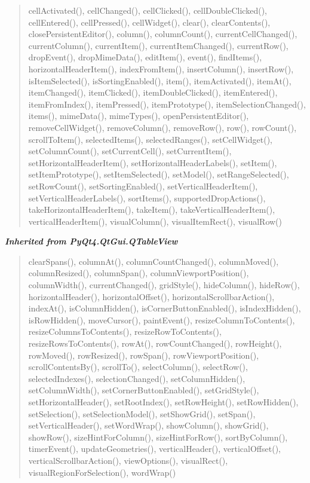 \begin{quote}
cellActivated(), cellChanged(), cellClicked(), cellDoubleClicked(), cellEntered(), cellPressed(), cellWidget(), clear(), clearContents(), closePersistentEditor(), column(), columnCount(), currentCellChanged(), currentColumn(), currentItem(), currentItemChanged(), currentRow(), dropEvent(), dropMimeData(), editItem(), event(), findItems(), horizontalHeaderItem(), indexFromItem(), insertColumn(), insertRow(), isItemSelected(), isSortingEnabled(), item(), itemActivated(), itemAt(), itemChanged(), itemClicked(), itemDoubleClicked(), itemEntered(), itemFromIndex(), itemPressed(), itemPrototype(), itemSelectionChanged(), items(), mimeData(), mimeTypes(), openPersistentEditor(), removeCellWidget(), removeColumn(), removeRow(), row(), rowCount(), scrollToItem(), selectedItems(), selectedRanges(), setCellWidget(), setColumnCount(), setCurrentCell(), setCurrentItem(), setHorizontalHeaderItem(), setHorizontalHeaderLabels(), setItem(), setItemPrototype(), setItemSelected(), setModel(), setRangeSelected(), setRowCount(), setSortingEnabled(), setVerticalHeaderItem(), setVerticalHeaderLabels(), sortItems(), supportedDropActions(), takeHorizontalHeaderItem(), takeItem(), takeVerticalHeaderItem(), verticalHeaderItem(), visualColumn(), visualItemRect(), visualRow()
\end{quote}

\large{\textbf{\textit{Inherited from PyQt4.QtGui.QTableView}}}

\begin{quote}
clearSpans(), columnAt(), columnCountChanged(), columnMoved(), columnResized(), columnSpan(), columnViewportPosition(), columnWidth(), currentChanged(), gridStyle(), hideColumn(), hideRow(), horizontalHeader(), horizontalOffset(), horizontalScrollbarAction(), indexAt(), isColumnHidden(), isCornerButtonEnabled(), isIndexHidden(), isRowHidden(), moveCursor(), paintEvent(), resizeColumnToContents(), resizeColumnsToContents(), resizeRowToContents(), resizeRowsToContents(), rowAt(), rowCountChanged(), rowHeight(), rowMoved(), rowResized(), rowSpan(), rowViewportPosition(), scrollContentsBy(), scrollTo(), selectColumn(), selectRow(), selectedIndexes(), selectionChanged(), setColumnHidden(), setColumnWidth(), setCornerButtonEnabled(), setGridStyle(), setHorizontalHeader(), setRootIndex(), setRowHeight(), setRowHidden(), setSelection(), setSelectionModel(), setShowGrid(), setSpan(), setVerticalHeader(), setWordWrap(), showColumn(), showGrid(), showRow(), sizeHintForColumn(), sizeHintForRow(), sortByColumn(), timerEvent(), updateGeometries(), verticalHeader(), verticalOffset(), verticalScrollbarAction(), viewOptions(), visualRect(), visualRegionForSelection(), wordWrap()
\end{quote}

